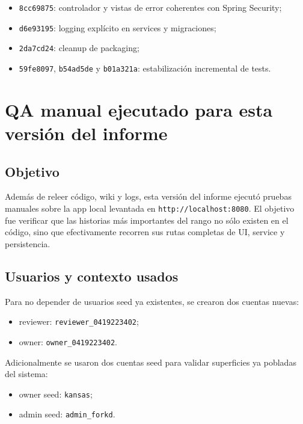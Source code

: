 \documentclass[11pt,a4paper]{report}
\newcommand{\commit}[1]{\texttt{#1}}
\newcommand{\code}[1]{\nolinkurl{#1}}
\begin{document}
\begin{itemize}
  \item \commit{8cc69875}: controlador y vistas de error coherentes con Spring Security;
  \item \commit{d6e93195}: logging expl\'icito en services y migraciones;
  \item \commit{2da7cd24}: cleanup de packaging;
  \item \commit{59fe8097}, \commit{b54ad5de} y \commit{b01a321a}: estabilizaci\'on incremental de tests.
\end{itemize}

\chapter{QA manual ejecutado para esta versi\'on del informe}

\section{Objetivo}

Adem\'as de releer c\'odigo, wiki y logs, esta versi\'on del informe ejecut\'o pruebas manuales sobre la app local levantada en \code{http://localhost:8080}. El objetivo fue verificar que las historias m\'as importantes del rango no s\'olo existen en el c\'odigo, sino que efectivamente recorren sus rutas completas de UI, service y persistencia.

\section{Usuarios y contexto usados}

Para no depender de usuarios seed ya existentes, se crearon dos cuentas nuevas:

\begin{itemize}
  \item reviewer: \code{reviewer\_0419223402};
  \item owner: \code{owner\_0419223402}.
\end{itemize}

Adicionalmente se usaron dos cuentas seed para validar superficies ya pobladas del sistema:

\begin{itemize}
  \item owner seed: \code{kansas};
  \item admin seed: \code{admin\_forkd}.
\end{itemize}
\end{document}
